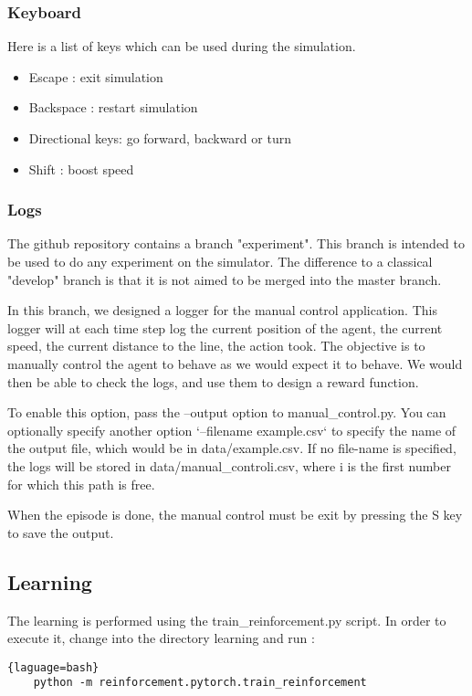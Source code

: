 \documentclass[12pt]{article}
\begin{document}
\subsubsection{Keyboard}
Here is a list of keys which can be used during the simulation.

\begin{itemize}
	\item Escape : exit simulation
	\item Backspace : restart simulation
	\item Directional keys: go forward, backward or turn
	\item Shift : boost speed
\end{itemize}

\subsubsection{Logs}
The github repository contains a branch "experiment". This branch is intended to be used to do any experiment on the simulator. The difference to a classical "develop" branch is that it is not aimed to be merged into the master branch. 

In this branch, we designed a logger for the manual control application. This logger will at each time step log the current position of the agent, the current speed, the current distance to the line, the action took. The objective is to manually control the agent to behave as we would expect it to behave. We would then be able to check the logs, and use them to design a reward function.

To enable this option, pass the --output option to manual\_control.py. You can optionally specify another option `--filename example.csv` to specify the name of the output file, which would be in data/example.csv. If no file-name is specified, the logs will be stored in data/manual\_controli.csv, where i is the first number for which this path is free.

When the episode is done, the manual control must be exit by pressing the S key to save the output.

\subsection{Learning}
The learning is performed using the train\_reinforcement.py script. In order to execute it, change into the directory learning and run : 

\begin{lstlisting}{laguage=bash}
    python -m reinforcement.pytorch.train_reinforcement
\end{lstlisting}
\end{document}
